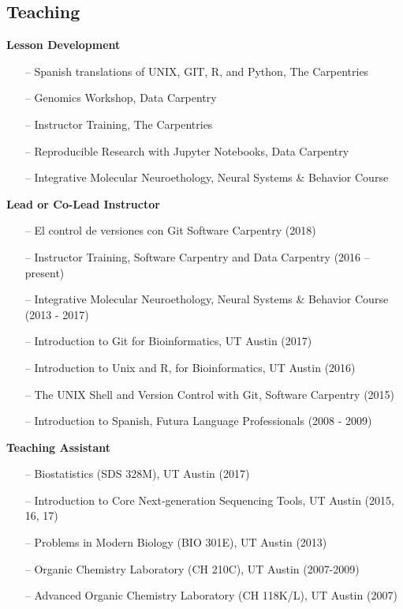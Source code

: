 \documentclass[margin,line]{CV}
\begin{document}
\begin{resume}
\section{\mysidestyle Teaching}
{\bf Lesson Development}
\begin{itemize}
\raggedright
\item[--] Spanish translations of UNIX, GIT, R, and Python, The Carpentries  
\item[--] Genomics Workshop, Data Carpentry
\item[--] Instructor Training, The Carpentries  
\item[--] Reproducible Research with Jupyter Notebooks, Data Carpentry
\item[--] Integrative Molecular Neuroethology, Neural Systems \& Behavior Course 

\end{itemize}

{\bf Lead or Co-Lead Instructor }
\begin{itemize}
\raggedright
\item[--] El control de versiones con Git Software Carpentry (2018)
\item[--] Instructor Training, Software Carpentry and Data Carpentry (2016 – present)
\item[--] Integrative Molecular Neuroethology, Neural Systems \& Behavior Course (2013 - 2017)
\item[--] Introduction to Git for Bioinformatics, UT Austin (2017)
\item[--] Introduction to Unix and R, for Bioinformatics, UT Austin (2016)
\item[--] The UNIX Shell and Version Control with Git, Software Carpentry (2015)
\item[--] Introduction to Spanish, Futura Language Professionals (2008 - 2009)
\end{itemize}

{\bf Teaching Assistant}
\begin{itemize}
\item[--] Biostatistics (SDS 328M), UT Austin (2017)
\item[--] Introduction to Core Next-generation Sequencing Tools, UT Austin (2015, 16, 17)
\item[--] Problems in Modern Biology (BIO 301E), UT Austin (2013)
\item[--] Organic Chemistry Laboratory (CH 210C), UT Austin (2007-2009)
\item[--] Advanced Organic Chemistry Laboratory (CH 118K/L), UT Austin (2007)
\end{itemize}


\end{resume}
\end{document}
